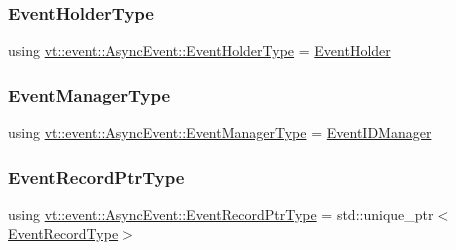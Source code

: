 \mbox{\label{structvt_1_1event_1_1_async_event_a6b529d829ccb5b12c50c2b1978c41a86}} 
\subsubsection{\texorpdfstring{Event\+Holder\+Type}{EventHolderType}}
{\footnotesize\ttfamily using \hyperlink{structvt_1_1event_1_1_async_event_a6b529d829ccb5b12c50c2b1978c41a86}{vt\+::event\+::\+Async\+Event\+::\+Event\+Holder\+Type} =  \hyperlink{structvt_1_1event_1_1_event_holder}{Event\+Holder}}

\mbox{\label{structvt_1_1event_1_1_async_event_a087519ac9e5ceaf317a2f6f583bfabd6}} 
\subsubsection{\texorpdfstring{Event\+Manager\+Type}{EventManagerType}}
{\footnotesize\ttfamily using \hyperlink{structvt_1_1event_1_1_async_event_a087519ac9e5ceaf317a2f6f583bfabd6}{vt\+::event\+::\+Async\+Event\+::\+Event\+Manager\+Type} =  \hyperlink{structvt_1_1event_1_1_event_i_d_manager}{Event\+I\+D\+Manager}}

\mbox{\label{structvt_1_1event_1_1_async_event_a858268f301cb838d33d21cc66232803b}} 
\subsubsection{\texorpdfstring{Event\+Record\+Ptr\+Type}{EventRecordPtrType}}
{\footnotesize\ttfamily using \hyperlink{structvt_1_1event_1_1_async_event_a858268f301cb838d33d21cc66232803b}{vt\+::event\+::\+Async\+Event\+::\+Event\+Record\+Ptr\+Type} =  std\+::unique\+\_\+ptr$<$\hyperlink{structvt_1_1event_1_1_async_event_a5b4ef37db6e5962fdc0e6e0e56e74bc1}{Event\+Record\+Type}$>$}

